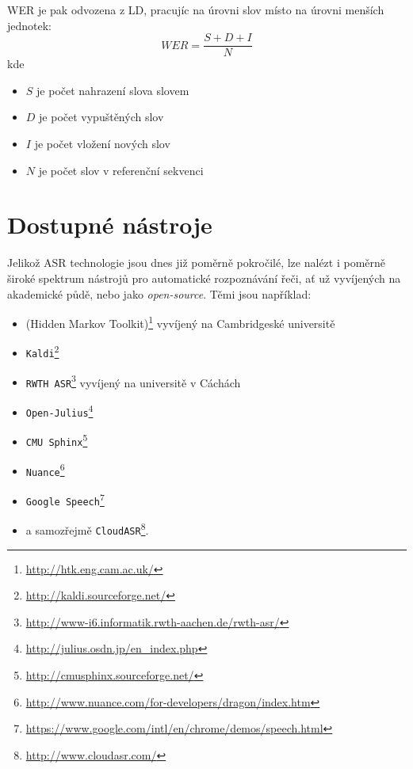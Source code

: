 WER je pak odvozena z LD, pracujíc na úrovni slov místo na úrovni menších jednotek:
%
\begin{equation}
	\label{eq:wer}
	WER = \frac{S+D+I}{N}
\end{equation}
%
kde
%
\begin{itemize}
\item $S$ je počet nahrazení slova slovem
\item $D$ je počet vypuštěných slov
\item $I$ je počet vložení nových slov
\item $N$ je počet slov v referenční sekvenci
\end{itemize}

\section{Dostupné nástroje}

Jelikož ASR technologie jsou dnes již poměrně pokročilé, lze nalézt i poměrně široké spektrum nástrojů pro automatické rozpoznávání řeči, ať už vyvíjených na akademické půdě, nebo jako {\sl open-source}.
\newpage
Těmi jsou například:
\begin{itemize}
\item {} (Hidden Markov Toolkit)\footnote{\url{http://htk.eng.cam.ac.uk/}} vyvíjený na Cambridgeské universitě
\item \verb|Kaldi|\footnote{\url{http://kaldi.sourceforge.net/}}
\item \verb|RWTH ASR|\footnote{\url{http://www-i6.informatik.rwth-aachen.de/rwth-asr/}} vyvíjený na universitě v Cáchách
\item \verb|Open-Julius|\footnote{\url{http://julius.osdn.jp/en_index.php}}
\item \verb|CMU Sphinx|\footnote{\url{http://cmusphinx.sourceforge.net/}}
\item \verb|Nuance|\footnote{\url{http://www.nuance.com/for-developers/dragon/index.htm}}
\item \verb|Google Speech|\footnote{\url{https://www.google.com/intl/en/chrome/demos/speech.html}}
\item a samozřejmě \verb|CloudASR|\footnote{\url{http://www.cloudasr.com/}}.
\end{itemize}